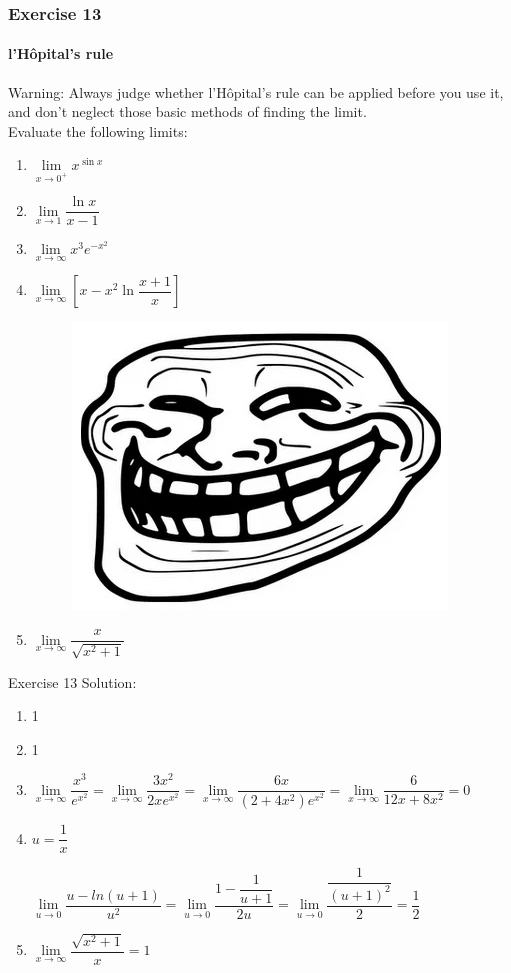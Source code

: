 \documentclass{beamer}
\begin{document}
\begin{frame}
		\frametitle{Exercise 13}
		\framesubtitle{l'Hôpital's rule}
		\alert{Warning}: Always judge whether l'Hôpital's rule can be applied before you use it, and \alert{don't neglect those basic methods of finding the limit}.\\
		\bigskip
		Evaluate the following limits:
		\begin{enumerate}
			\item $\lim\limits_{\textit{x} \to 0^{+}}x^{\sin{x}}$
			\item $\lim\limits_{\textit{x} \to 1}\dfrac{\ln x}{x-1}$
			\item $\lim\limits_{\textit{x} \to \infty}x^{3}e^{-x^{2}}$
			\item $\lim\limits_{\textit{x} \to \infty}[x - x^{2}\ln{\dfrac{x + 1}{x}}]$\\
				\begin{figure}
					\includegraphics[width=0.1\linewidth]{troll.png}
				\end{figure}
			\item \begin{center}
					$\lim\limits_{\textit{x} \to \infty}\dfrac{x}{\sqrt{x^{2} + 1}}$
				\end{center}
		\end{enumerate}
	\end{frame}

\begin{frame}{Exercise 13}
Solution:
\begin{enumerate}
    \item 1
    \item 1
    \item $\lim\limits_{\textit{x} \to \infty}\dfrac{x^3}{e^{x^2}} = \lim\limits_{\textit{x} \to \infty} \dfrac{3x^2}{2xe^{x^2}} = \lim\limits_{\textit{x} \to \infty} \dfrac{6x}{(2 + 4x^2)e^{x^2}} =  \lim\limits_{\textit{x} \to \infty} \dfrac{6}{12x + 8x^2} = 0$
    \item $ u = \dfrac{1}{x}$
    
    
    $\lim\limits_{\textit{u} \to 0} \dfrac{u - ln(u+1)}{u^2} = \lim\limits_{\textit{u} \to 0} \dfrac{1 - \dfrac{1}{u+1}}{2u} = \lim\limits_{\textit{u} \to 0} \dfrac{\dfrac{1}{(u+1)^2}}{2} = \dfrac{1}{2}$
    \item $\lim\limits_{\textit{x} \to \infty} \dfrac{\sqrt{x^2 + 1}}{x} = 1$
\end{enumerate}
    
\end{frame}
\end{document}
